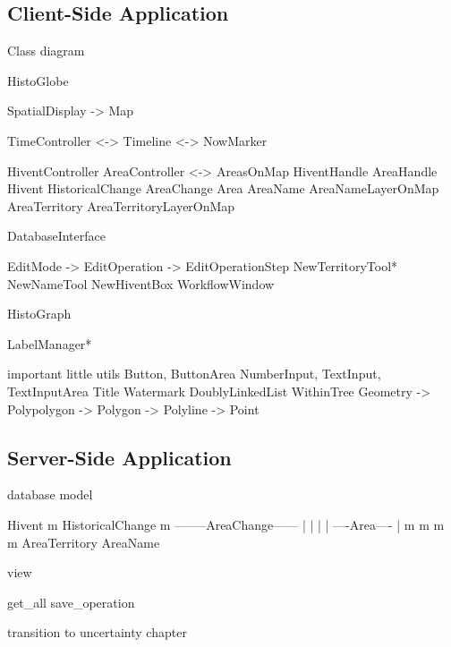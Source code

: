 

\subsection{Client-Side Application} %
\label{sub:client_side_application}

Class diagram

HistoGlobe

SpatialDisplay -> Map

TimeController  <-> Timeline
                <-> NowMarker

HiventController                AreaController <->  AreasOnMap
HiventHandle                    AreaHandle
Hivent
HistoricalChange    AreaChange  Area
                                AreaName            AreaNameLayerOnMap
                                AreaTerritory       AreaTerritoryLayerOnMap

DatabaseInterface

EditMode -> EditOperation -> EditOperationStep
NewTerritoryTool* NewNameTool NewHiventBox
WorkflowWindow

HistoGraph

LabelManager*

important little utils
  Button, ButtonArea
  NumberInput, TextInput, TextInputArea
  Title
  Watermark
  DoublyLinkedList
  WithinTree
  Geometry -> Polypolygon -> Polygon -> Polyline -> Point



\subsection{Server-Side Application} %
\label{sub:server_side_application}

database model

           Hivent
             m
       HistoricalChange
             m
  --------AreaChange------
  |          |           |
  |     ----Area----     |
  m     m          m     m
AreaTerritory      AreaName


view

get\_all
save\_operation




\vspace{2em}
transition to uncertainty chapter

